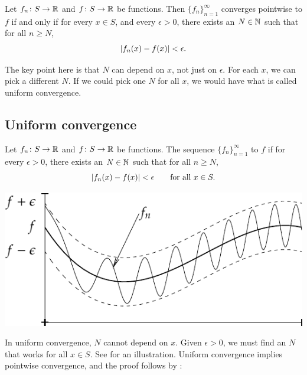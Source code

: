 \begin{prop} \label{ptwsconv:prop}
Let $f_n \colon S \to {\mathbb{R}}$ and $f \colon S \to {\mathbb{R}}$ be functions.
Then $\{ f_n \}_{n=1}^\infty$ converges pointwise to $f$ if and only if
for every $x \in S$, and every $\epsilon > 0$, there exists
an $N \in {\mathbb{N}}$ such that for all
$n \geq N$,
\begin{equation*}
\left\lvert {f_n(x)-f(x)} \right\rvert < \epsilon .
\end{equation*}
\end{prop}

The key point here is that $N$ can depend on $x$, not just on
$\epsilon$.  For each $x$, we can pick a different $N$.
If we could pick one $N$ for all $x$, we would have what is called
uniform convergence.

\subsection{Uniform convergence}

\begin{defn}
Let $f_n \colon S \to {\mathbb{R}}$
and $f \colon S \to {\mathbb{R}}$
be functions.  The sequence $\{ f_n \}_{n=1}^\infty$
\emph{} to $f$ if for
every $\epsilon > 0$, there exists an $N \in {\mathbb{N}}$ such that 
for all $n \geq N$,
\begin{equation*}
\left\lvert {f_n(x) - f(x)} \right\rvert < \epsilon \qquad \text{for all } x \in S.
\end{equation*}
\end{defn}
\begin{myfigureht}
\includegraphics{figures/uniformconv}
\caption{In uniform convergence,
for $n \geq N$,
the functions $f_n$ are within a strip of $\pm\epsilon$ from $f$.%
\label{fig:uniformconv}}
\end{myfigureht}

In uniform convergence, $N$ cannot depend on $x$.  Given $\epsilon > 0$,
we must find an $N$ that works for all $x \in S$.  See
 for an illustration.
Uniform convergence
implies pointwise convergence, and the proof follows by
:

